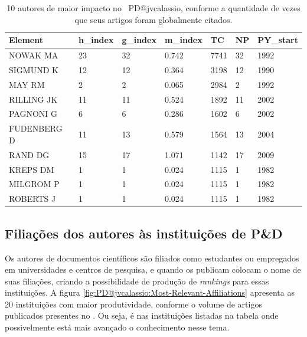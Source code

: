 \begin{table}[htp]
    \centering
    \footnotesize
    \begin{tabular}{|l|l|l|l|l|l|l|}
    \hline
        Element & h\_index & g\_index & m\_index & TC & NP & PY\_start \\ \hline
        NOWAK MA & 23 & 32 & 0.742 & 7741 & 32 & 1992 \\ \hline
        SIGMUND K & 12 & 12 & 0.364 & 3198 & 12 & 1990 \\ \hline
        MAY RM & 2 & 2 & 0.065 & 2984 & 2 & 1992 \\ \hline
        RILLING JK & 11 & 11 & 0.524 & 1892 & 11 & 2002 \\ \hline
        PAGNONI G & 6 & 6 & 0.286 & 1602 & 6 & 2002 \\ \hline
        FUDENBERG D & 11 & 13 & 0.579 & 1564 & 13 & 2004 \\ \hline
        RAND DG & 15 & 17 & 1.071 & 1142 & 17 & 2009 \\ \hline
        KREPS DM & 1 & 1 & 0.024 & 1115 & 1 & 1982 \\ \hline
        MILGROM P & 1 & 1 & 0.024 & 1115 & 1 & 1982 \\ \hline
        ROBERTS J & 1 & 1 & 0.024 & 1115 & 1 & 1982 \\ \hline
    \end{tabular}
    \caption{10 autores de maior impacto no \dataset\ PD@jvcalassio, conforme a quantidade de vezes que seus artigos foram globalmente citados.}
    \label{tab:PD@jvcalassio:Author:ImpactoQtdPublicacoes}
\end{table}

\subsection{Filiações dos autores às instituições de P\&D}

Os autores de documentos científicos são filiados como estudantes ou empregados em universidades e centros de pesquisa, e quando os publicam colocam o nome de suas filiações, criando a possibilidade de produção de \textit{rankings} para essas instituições. A figura \ref{fig:PD@jvcalassio:Most-Relevant-Affiliations} apresenta as 20 instituições com maior produtividade, conforme o volume de artigos publicados presentes no \dataset. Ou seja, é nas instituições listadas na tabela onde possivelmente está mais avançado o conhecimento nesse tema. 

